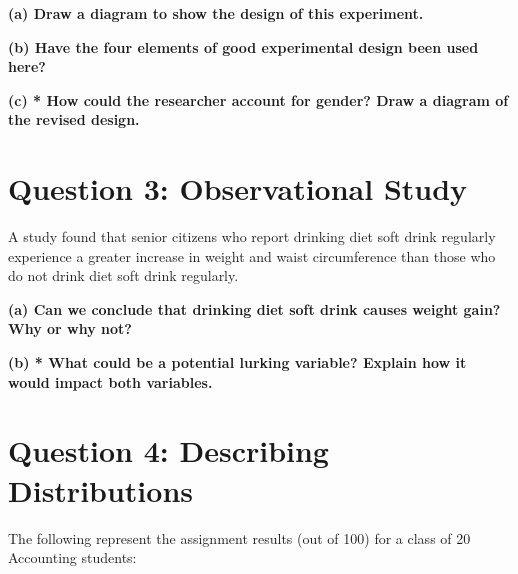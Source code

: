 \documentclass[
  11pt,
  oneside]{scrbook}
\begin{document}
\textbf{(a) Draw a diagram to show the design of this experiment.}

\begin{answerbox}\vspace{5cm}\end{answerbox}

\textbf{(b) Have the four elements of good experimental design been used here?}

\begin{answerbox}\vspace{4cm}\end{answerbox}

\textbf{(c) * How could the researcher account for gender? Draw a diagram of the revised design.}

\begin{answerbox}\vspace{5cm}\end{answerbox}

\section{Question 3: Observational Study}\label{question-3-observational-study}

A study found that senior citizens who report drinking diet soft drink regularly experience a greater increase in weight and waist circumference than those who do not drink diet soft drink regularly.

\textbf{(a) Can we conclude that drinking diet soft drink causes weight gain? Why or why not?}

\begin{answerbox}\vspace{4cm}\end{answerbox}

\textbf{(b) * What could be a potential lurking variable? Explain how it would impact both variables.}

\begin{answerbox}\vspace{4cm}\end{answerbox}

\section{Question 4: Describing Distributions}\label{question-4-describing-distributions}

The following represent the assignment results (out of 100) for a class of 20 Accounting students:
\end{document}
